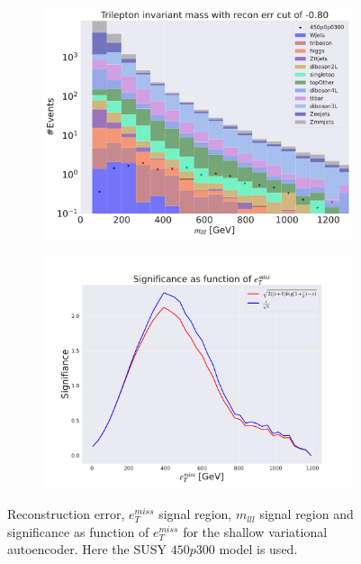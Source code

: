 \begin{figure}[H]
    \hfill
    \begin{subfigure}{.40\textwidth}
        \includegraphics[width=\textwidth]{Figures/VAE_testing/small/3lep/b_data_recon_big_rm3_feats_sig_450p0p0300_mlll_recon_errcut_-0.80.pdf}
        \caption{}
        \label{fig:VAE_3lep_small_mlll_450_2}
    \end{subfigure}
    \hfill   
    \begin{subfigure}{.40\textwidth}
        \includegraphics[width=\textwidth]{Figures/VAE_testing/small/3lep/significance_etmiss_450p0p0300_-0.7957779204248656.pdf}
        \caption{}
        \label{fig:VAE_3lep_small_signi_450_2}
    \end{subfigure}
    \hfill      
    \caption[3lep shallow network | $450p300$ | VAE | 2]{Reconstruction error, $e_T^{miss}$ signal region, $m_{lll}$ signal region and significance as function of 
    $e_T^{miss}$ for the shallow variational autoencoder. Here the SUSY $450p300$ model is used.}
    \label{fig:VAE_3lep_small_rec_sig_signi_450_2}
\end{figure}








